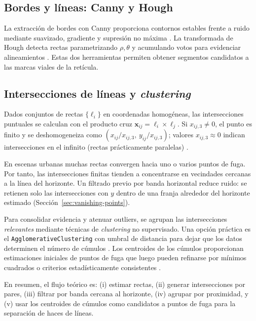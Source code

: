 \subsection{Bordes y líneas: Canny y Hough}\label{sec:canny-hough}

La extracción de bordes con Canny proporciona contornos estables frente a ruido mediante suavizado, gradiente y supresión no máxima \cite{canny1986edge}. La transformada de Hough detecta rectas parametrizando \(\rho,\theta\) y acumulando votos para evidenciar alineamientos \cite{ballard1981hough}. Estas dos herramientas permiten obtener segmentos candidatos a las marcas viales de la retícula.

\subsection{Intersecciones de líneas y \textit{clustering}}\label{sec:intersections-clustering}

Dados conjuntos de rectas \(\{\ell_i\}\) en coordenadas homogéneas, las intersecciones puntuales se calculan con el producto cruz
\(\mathbf{x}_{ij} = \ell_i \times \ell_j\). Si \(x_{ij,3} \neq 0\), el punto es finito y se deshomogeneiza como \( (x_{ij}/x_{ij,3},\ y_{ij}/x_{ij,3}) \); valores \(x_{ij,3} \approx 0\) indican intersecciones en el infinito (rectas prácticamente paralelas) \cite{hartley2003multiple}.


En escenas urbanas muchas rectas convergen hacia uno o varios puntos de fuga. Por tanto, las
intersecciones finitas tienden a concentrarse en vecindades cercanas a la línea del horizonte. Un filtrado previo por banda horizontal reduce ruido: se retienen solo las intersecciones con \(y\) dentro de una franja alrededor del horizonte estimado (Sección~\ref{sec:vanishing-points}).


Para consolidar evidencia y atenuar outliers, se agrupan las intersecciones \emph{relevantes} mediante técnicas de \textit{clustering} no supervisado.
Una opción práctica es el \texttt{AgglomerativeClustering} con umbral de distancia para dejar que los datos determinen el número de cúmulos \cite{tan2005introduction}. Los centroides de los cúmulos proporcionan estimaciones iniciales de puntos de fuga que luego pueden refinarse por mínimos cuadrados o criterios estadísticamente consistentes
\cite{kanatani1998statistical,hartley2003multiple}.


En resumen, el flujo teórico es: (i) estimar rectas, (ii) generar intersecciones por pares, (iii) filtrar por banda cercana al horizonte,
(iv) agrupar por proximidad, y (v) usar los centroides de cúmulos como candidatos a puntos de fuga para la separación de haces de líneas.

